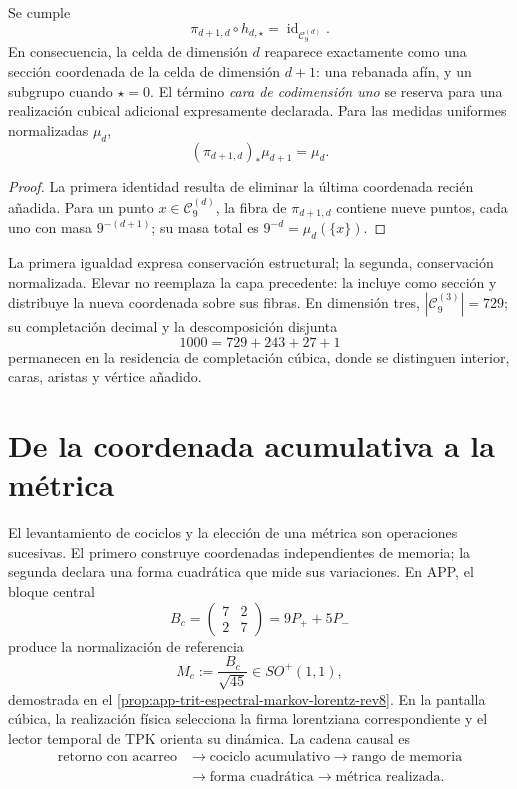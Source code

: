 \begin{proposition}
\label{prop:conservacion-elevacion-dimensional-rev2}
Se cumple
\[
 \pi_{d+1,d}\circ h_{d,\star}=\operatorname{id}_{\mathcal C_9^{(d)}}.
\]
En consecuencia, la celda de dimensión \(d\) reaparece exactamente como una
sección coordenada de la celda de dimensión \(d+1\): una rebanada afín, y un
subgrupo cuando \(\star=0\). El término \emph{cara de codimensión uno} se
reserva para una realización cubical adicional expresamente declarada. Para las medidas
uniformes normalizadas \(\mu_d\),
\[
 (\pi_{d+1,d})_*\mu_{d+1}=\mu_d.
\]
\end{proposition}

\begin{proof}
La primera identidad resulta de eliminar la última coordenada recién
añadida. Para un punto \(x\in\mathcal C_9^{(d)}\), la fibra de
\(\pi_{d+1,d}\) contiene nueve puntos, cada uno con masa
\(9^{-(d+1)}\); su masa total es \(9^{-d}=\mu_d(\{x\})\).
\end{proof}

La primera igualdad expresa conservación estructural; la segunda,
conservación normalizada. Elevar no reemplaza la capa precedente: la incluye
como sección y distribuye la nueva coordenada sobre sus fibras. En dimensión
tres, \(|\mathcal C_9^{(3)}|=729\); su completación decimal y la
descomposición disjunta
\[
 1000=729+243+27+1
\]
permanecen en la residencia de completación cúbica, donde se distinguen
interior, caras, aristas y vértice añadido.

\section{De la coordenada acumulativa a la métrica}

El levantamiento de cociclos y la elección de una métrica son operaciones
sucesivas. El primero construye coordenadas independientes de memoria; la
segunda declara una forma cuadrática que mide sus variaciones. En APP, el
bloque central
\[
 B_c=\begin{pmatrix}7&2\\2&7\end{pmatrix}=9P_++5P_-
\]
produce la normalización de referencia
\[
 M_c:=\frac{B_c}{\sqrt{45}}\in SO^+(1,1),
\]
demostrada en el \cref{prop:app-trit-espectral-markov-lorentz-rev8}.
En la pantalla cúbica, la realización física selecciona la
firma lorentziana correspondiente y el lector temporal de TPK orienta su
dinámica. La cadena causal es
\[
 \begin{aligned}
 \text{retorno con acarreo}
 &\longrightarrow\text{cociclo acumulativo}
 \longrightarrow\text{rango de memoria}\\
 &\longrightarrow\text{forma cuadrática}
 \longrightarrow\text{métrica realizada}.
 \end{aligned}
\]


